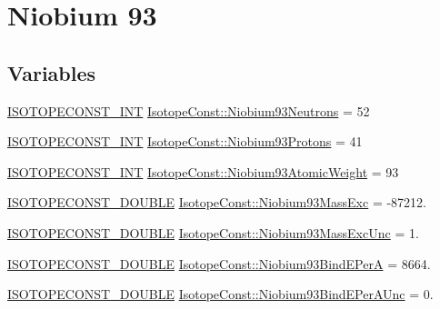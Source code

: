 \hypertarget{group___isotope_const-_niobium-_nb93}{}\section{Niobium 93}
\label{group___isotope_const-_niobium-_nb93}
\subsection*{Variables}
\begin{DoxyCompactItemize}
\item 
\mbox{\hyperlink{group___isotope_const-_macros_ga5f18360b3e99483a35c32d789e62621c}{I\+S\+O\+T\+O\+P\+E\+C\+O\+N\+S\+T\+\_\+\+I\+NT}} \mbox{\hyperlink{group___isotope_const-_niobium-_nb93_ga91df60cf483ff069c4135af5a4f5b894}{Isotope\+Const\+::\+Niobium93\+Neutrons}} = 52
\item 
\mbox{\hyperlink{group___isotope_const-_macros_ga5f18360b3e99483a35c32d789e62621c}{I\+S\+O\+T\+O\+P\+E\+C\+O\+N\+S\+T\+\_\+\+I\+NT}} \mbox{\hyperlink{group___isotope_const-_niobium-_nb93_ga90e5fc6d270603d5df97601ff4f997b6}{Isotope\+Const\+::\+Niobium93\+Protons}} = 41
\item 
\mbox{\hyperlink{group___isotope_const-_macros_ga5f18360b3e99483a35c32d789e62621c}{I\+S\+O\+T\+O\+P\+E\+C\+O\+N\+S\+T\+\_\+\+I\+NT}} \mbox{\hyperlink{group___isotope_const-_niobium-_nb93_gafb7d0656a4ebced3c2ceb92d128e170e}{Isotope\+Const\+::\+Niobium93\+Atomic\+Weight}} = 93
\item 
\mbox{\hyperlink{group___isotope_const-_macros_ga8f45a7272ce02c0b4c65c44636ed719a}{I\+S\+O\+T\+O\+P\+E\+C\+O\+N\+S\+T\+\_\+\+D\+O\+U\+B\+LE}} \mbox{\hyperlink{group___isotope_const-_niobium-_nb93_ga1becd7697a77a8174f6944a68d42a366}{Isotope\+Const\+::\+Niobium93\+Mass\+Exc}} = -\/87212.
\item 
\mbox{\hyperlink{group___isotope_const-_macros_ga8f45a7272ce02c0b4c65c44636ed719a}{I\+S\+O\+T\+O\+P\+E\+C\+O\+N\+S\+T\+\_\+\+D\+O\+U\+B\+LE}} \mbox{\hyperlink{group___isotope_const-_niobium-_nb93_ga0be31d6daef5ae8b273b43108c22ee65}{Isotope\+Const\+::\+Niobium93\+Mass\+Exc\+Unc}} = 1.
\item 
\mbox{\hyperlink{group___isotope_const-_macros_ga8f45a7272ce02c0b4c65c44636ed719a}{I\+S\+O\+T\+O\+P\+E\+C\+O\+N\+S\+T\+\_\+\+D\+O\+U\+B\+LE}} \mbox{\hyperlink{group___isotope_const-_niobium-_nb93_gad0ad5d175ea5d1cad01f4d64939295f6}{Isotope\+Const\+::\+Niobium93\+Bind\+E\+PerA}} = 8664.
\item 
\mbox{\hyperlink{group___isotope_const-_macros_ga8f45a7272ce02c0b4c65c44636ed719a}{I\+S\+O\+T\+O\+P\+E\+C\+O\+N\+S\+T\+\_\+\+D\+O\+U\+B\+LE}} \mbox{\hyperlink{group___isotope_const-_niobium-_nb93_ga03f85b4c96f301b66e0f87081ff2a06b}{Isotope\+Const\+::\+Niobium93\+Bind\+E\+Per\+A\+Unc}} = 0.

\end{DoxyCompactItemize}
